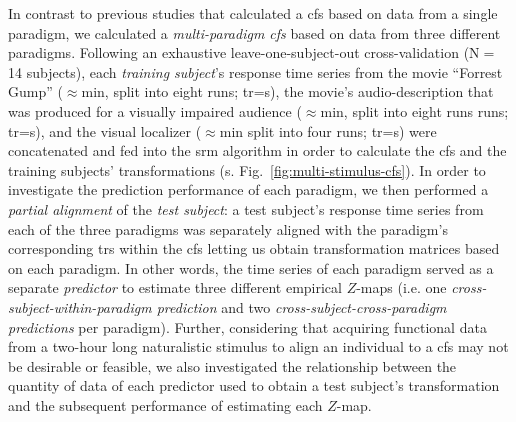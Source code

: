 In contrast to previous studies \citep{jiahui2020predicting,
guntupalli2016model, haxby2011common} that calculated a \ac{cfs} based on data
from a single paradigm, we calculated a \textit{multi-paradigm \ac{cfs}} based
on data from three different paradigms.
Following an exhaustive leave-one-subject-out cross-validation (N$=$14
subjects), each \textit{training subject}'s response time series from
%
the movie ``Forrest Gump'' ($\approx$\unit[120]{min}, split into eight runs;
\ac{tr}=\unit[2]{s}),
%
the movie's audio-description that was produced for a visually impaired audience
($\approx$\unit[120]{min}, split into eight runs runs; \ac{tr}=\unit[2]{s}), and
%
the visual localizer ($\approx$\unit[20]{min} split into four runs;
\ac{tr}=\unit[2]{s})
%
were concatenated and fed into the \ac{srm} algorithm in order to calculate the
\ac{cfs} and the training subjects' transformations (s.
Fig.~\ref{fig:multi-stimulus-cfs}).
In order to investigate the prediction performance of each paradigm, we then
performed a \textit{partial alignment} of the \textit{test subject}:
%
a test subject's response time series from each of the three paradigms was
separately aligned with the paradigm's corresponding \acp{tr} within the
\ac{cfs} letting us obtain transformation matrices based on each paradigm.
%
In other words, the time series of each paradigm served as a separate
\textit{predictor} to estimate three different empirical $Z$-maps (i.e. one
\textit{cross-subject-within-paradigm prediction} and two
\textit{cross-subject-cross-paradigm predictions} per paradigm).
%
Further, considering that acquiring functional data from a two-hour long
naturalistic stimulus to align an individual to a \ac{cfs} may not be desirable
or feasible, we also investigated the relationship between the quantity of data
of each predictor used to obtain a test subject's transformation and the
subsequent performance of estimating each $Z$-map.





